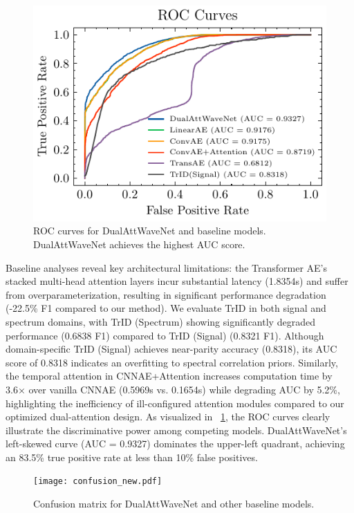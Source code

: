 \documentclass[conference]{IEEEtran}
\begin{document}
\begin{figure}[tbp]
    \centering
    \includegraphics[width=0.9\linewidth]{roc-comparison.pdf}
    \caption{ROC curves for DualAttWaveNet and baseline models. DualAttWaveNet achieves the highest AUC score.}
    \label{fig:roc_comparison}
\end{figure}


Baseline analyses reveal key architectural limitations: the Transformer AE's stacked multi-head attention layers incur substantial latency (1.8354s) and suffer from overparameterization, resulting in significant performance degradation (-22.5\% F1 compared to our method). We evaluate TrID in both signal and spectrum domains, with TrID (Spectrum) showing significantly degraded performance (0.6838 F1) compared to TrID (Signal) (0.8321 F1). Although domain-specific TrID (Signal) achieves near-parity accuracy (0.8318), its AUC score of 0.8318 indicates an overfitting to spectral correlation priors. Similarly, the temporal attention in CNNAE+Attention increases computation time by 3.6× over vanilla CNNAE (0.5969s vs. 0.1654s) while degrading AUC by 5.2\%, highlighting the inefficiency of ill-configured attention modules compared to our optimized dual-attention design. As visualized in \figurename~\ref{fig:roc_comparison}, the ROC curves clearly illustrate the discriminative power among competing models. DualAttWaveNet's left-skewed curve (AUC = 0.9327) dominates the upper-left quadrant, achieving an 83.5\% true positive rate at less than 10\% false positives. 

\begin{figure}[htbp]
    \centering
    \texttt{[image: confusion\_new.pdf]}
    \caption{Confusion matrix for DualAttWaveNet and other baseline models.}
    \label{fig:confusion_matrix}
\end{figure}
\end{document}
